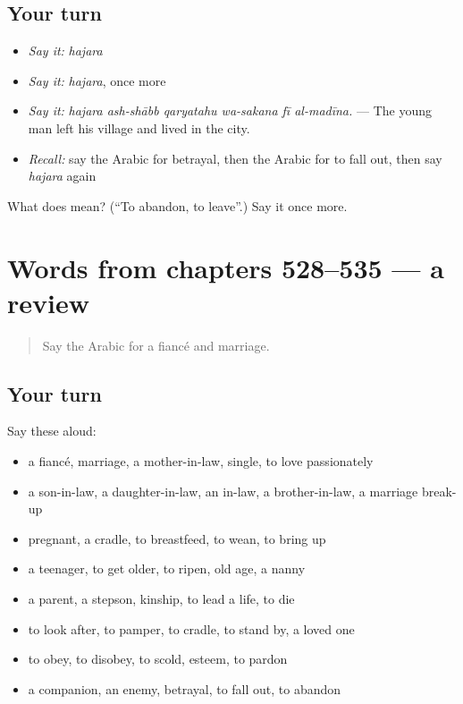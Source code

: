 \subsection*{Your turn}
\begin{itemize}
\raggedright
  \item \emph{Say it:} \emph{hajara}
  \item \emph{Say it:} \emph{hajara}, once more
  \item \emph{Say it:} \emph{hajara ash-shābb qaryatahu wa-sakana fī al-madīna.} — The young man left his village and lived in the city.
  \item \emph{Recall:} say the Arabic for betrayal, then the Arabic for to fall out, then say \emph{hajara} again
\end{itemize}

\begin{tcolorbox}[breakable,colback=teal!4,colframe=teal!35!black,title={Before you move on}]
What does  mean? (\textquotedblleft{}To abandon, to leave\textquotedblright{}.) Say it once more.
\end{tcolorbox}
\section[(dialogue)]{Words from chapters 528–535 — a review}

\label{lesson:AR-R535-review-528-535}



\begin{quote}
Say the Arabic for a fiancé and marriage.
\end{quote}

\subsection*{Your turn}
Say these aloud:

\begin{itemize}
\raggedright
  \item a fiancé, marriage, a mother-in-law, single, to love passionately
  \item a son-in-law, a daughter-in-law, an in-law, a brother-in-law, a marriage break-up
  \item pregnant, a cradle, to breastfeed, to wean, to bring up
  \item a teenager, to get older, to ripen, old age, a nanny
  \item a parent, a stepson, kinship, to lead a life, to die
  \item to look after, to pamper, to cradle, to stand by, a loved one
  \item to obey, to disobey, to scold, esteem, to pardon
  \item a companion, an enemy, betrayal, to fall out, to abandon
\end{itemize}

